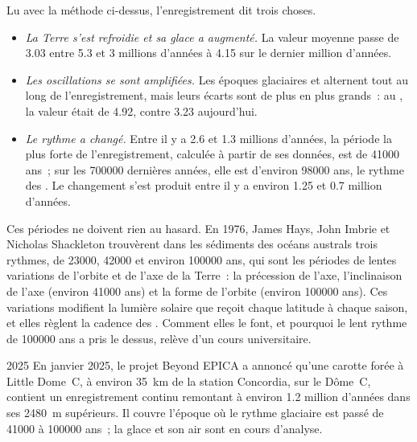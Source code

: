 Lu avec la méthode ci-dessus, l'enregistrement dit trois choses.
\begin{itemize}
  \item \emph{La Terre s'est refroidie et sa glace a augmenté.} La valeur
        moyenne passe de \qty{3.03}{\permil} entre 5.3 et 3 millions
        d'années à \qty{4.15}{\permil} sur le dernier million d'années.
  \item \emph{Les oscillations se sont amplifiées.} Les époques glaciaires
        et  alternent tout au long de l'enregistrement, mais
        leurs écarts sont de plus en plus grands~: au , la valeur était de \qty{4.92}{\permil}, contre
        \qty{3.23}{\permil} aujourd'hui.
  \item \emph{Le rythme a changé.} Entre il y a 2.6 et 1.3 millions d'années, la
        période la plus forte de l'enregistrement, calculée à partir de ses
        données, est de \num{41000} ans~; sur les \num{700000} dernières
        années, elle est d'environ \num{98000} ans, le rythme des . Le changement s'est produit entre il y a environ 1.25 et
        0.7 million d'années.
\end{itemize}

Ces périodes ne doivent rien au hasard. En 1976, James Hays, John Imbrie et
Nicholas Shackleton trouvèrent dans les sédiments des océans australs trois
rythmes, de \num{23000}, \num{42000} et environ \num{100000} ans, qui sont
les périodes de lentes variations de l'orbite et de l'axe de la Terre~: la
précession de l'axe, l'inclinaison de l'axe (environ \num{41000} ans) et
la forme de l'orbite (environ \num{100000} ans). Ces variations modifient
la lumière solaire que reçoit chaque latitude à chaque saison, et elles
règlent la cadence des . Comment elles le font, et
pourquoi le lent rythme de \num{100000} ans a pris le dessus, relève d'un
cours universitaire.

\begin{dated}{2025}
En janvier 2025, le projet Beyond EPICA a annoncé qu'une carotte forée à
Little Dome~C, à environ \qty{35}{km} de la station Concordia, sur le
Dôme~C, contient un enregistrement continu remontant à environ 1.2 million
d'années dans ses \qty{2480}{m} supérieurs. Il couvre l'époque où le rythme
glaciaire est passé de \num{41000} à \num{100000} ans~; la glace et son air
sont en cours d'analyse.
\end{dated}

